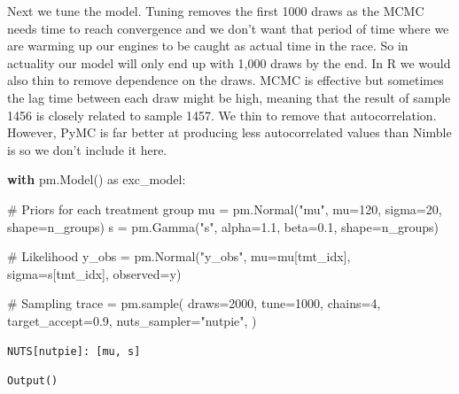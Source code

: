 \documentclass[
  letterpaper,
  DIV=11,
  numbers=noendperiod]{scrartcl}
\newenvironment{Shaded}{\begin{snugshade}}{\end{snugshade}}
\newcommand{\CommentTok}[1]{\textcolor[rgb]{0.37,0.37,0.37}{#1}}
\newcommand{\ControlFlowTok}[1]{\textcolor[rgb]{0.00,0.23,0.31}{\textbf{#1}}}
\newcommand{\DecValTok}[1]{\textcolor[rgb]{0.68,0.00,0.00}{#1}}
\newcommand{\FloatTok}[1]{\textcolor[rgb]{0.68,0.00,0.00}{#1}}
\newcommand{\ImportTok}[1]{\textcolor[rgb]{0.00,0.46,0.62}{#1}}
\newcommand{\NormalTok}[1]{\textcolor[rgb]{0.00,0.23,0.31}{#1}}
\newcommand{\OperatorTok}[1]{\textcolor[rgb]{0.37,0.37,0.37}{#1}}
\newcommand{\StringTok}[1]{\textcolor[rgb]{0.13,0.47,0.30}{#1}}
\begin{document}
Next we tune the model. Tuning removes the first 1000 draws as the MCMC
needs time to reach convergence and we don't want that period of time
where we are warming up our engines to be caught as actual time in the
race. So in actuality our model will only end up with 1,000 draws by the
end. In R we would also thin to remove dependence on the draws. MCMC is
effective but sometimes the lag time between each draw might be high,
meaning that the result of sample 1456 is closely related to sample
1457. We thin to remove that autocorrelation. However, PyMC is far
better at producing less autocorrelated values than Nimble is so we
don't include it here.

\begin{Shaded}
\begin{Highlighting}[]
\ControlFlowTok{with}\NormalTok{ pm.Model() }\ImportTok{as}\NormalTok{ exc\_model:}
    
    \CommentTok{\# Priors for each treatment group}
\NormalTok{    mu }\OperatorTok{=}\NormalTok{ pm.Normal(}\StringTok{"mu"}\NormalTok{, mu}\OperatorTok{=}\DecValTok{120}\NormalTok{, sigma}\OperatorTok{=}\DecValTok{20}\NormalTok{, shape}\OperatorTok{=}\NormalTok{n\_groups)}
\NormalTok{    s }\OperatorTok{=}\NormalTok{ pm.Gamma(}\StringTok{"s"}\NormalTok{, alpha}\OperatorTok{=}\FloatTok{1.1}\NormalTok{, beta}\OperatorTok{=}\FloatTok{0.1}\NormalTok{, shape}\OperatorTok{=}\NormalTok{n\_groups)}
    
    \CommentTok{\# Likelihood}
\NormalTok{    y\_obs }\OperatorTok{=}\NormalTok{ pm.Normal(}\StringTok{"y\_obs"}\NormalTok{, mu}\OperatorTok{=}\NormalTok{mu[tmt\_idx], sigma}\OperatorTok{=}\NormalTok{s[tmt\_idx], observed}\OperatorTok{=}\NormalTok{y)}
    
    \CommentTok{\# Sampling}
\NormalTok{    trace }\OperatorTok{=}\NormalTok{ pm.sample(}
\NormalTok{        draws}\OperatorTok{=}\DecValTok{2000}\NormalTok{,}
\NormalTok{        tune}\OperatorTok{=}\DecValTok{1000}\NormalTok{,}
\NormalTok{        chains}\OperatorTok{=}\DecValTok{4}\NormalTok{,}
\NormalTok{        target\_accept}\OperatorTok{=}\FloatTok{0.9}\NormalTok{,}
\NormalTok{        nuts\_sampler}\OperatorTok{=}\StringTok{"nutpie"}\NormalTok{,}
\NormalTok{    )}
\end{Highlighting}
\end{Shaded}

\begin{verbatim}
NUTS[nutpie]: [mu, s]
\end{verbatim}

\begin{verbatim}
Output()
\end{verbatim}
\end{document}

